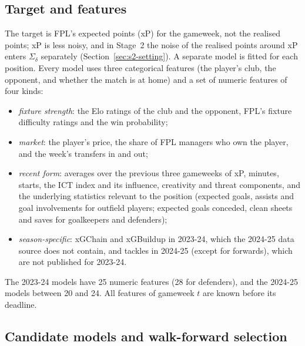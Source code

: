 \documentclass[12pt,oneside,a4paper]{book}
\theoremstyle{definition}
\theoremstyle{remark}
\begin{document}
	\subsection{Target and features}
	\label{sec:predictions-features}

	The target is FPL's expected points (xP) for the gameweek, not the realised points; xP is less
	noisy, and in Stage~2 the noise of the realised points around xP enters $\Sigma_\delta$
	separately (Section~\ref{sec:s2-setting}). A separate model is fitted for each position. Every model uses
	three categorical features (the player's club, the opponent, and whether the match is at home)
	and a set of numeric features of four kinds:
	\begin{itemize}
		\item \emph{fixture strength}: the Elo ratings of the club and the opponent, FPL's fixture
		difficulty ratings and the win probability;
		\item \emph{market}: the player's price, the share of FPL managers who own the player,
		and the week's transfers in and out;
		\item \emph{recent form}: averages over the previous three gameweeks of xP, minutes, starts,
		the ICT index and its influence, creativity and threat components, and the underlying
		statistics relevant to the position (expected goals, assists and goal involvements for
		outfield players; expected goals conceded, clean sheets and saves for goalkeepers and
		defenders);
		\item \emph{season-specific}: xGChain and xGBuildup in 2023-24, which the 2024-25 data source
		does not contain, and tackles in 2024-25 (except for forwards), which are not published for
		2023-24.
	\end{itemize}
	The 2023-24 models have 25 numeric features (28 for defenders), and the 2024-25 models between
	20 and 24. All features of gameweek $t$ are known before its deadline.

	\subsection{Candidate models and walk-forward selection}
	\label{sec:predictions-selection}
\end{document}
